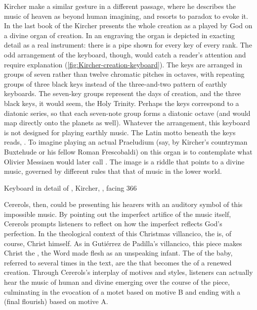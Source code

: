 Kircher make a similar gesture in a different passage, where he describes the
music of heaven as beyond human imagining, and resorts to paradox to evoke it.
In the last book of the  Kircher presents the whole creation as
a  played by God on a divine organ of creation.%
    \Autocite[177]{Godwin:KircherTheater}
In an engraving the organ is depicted in exacting detail as a real instrument:
there is a pipe shown for every key of every rank.%
    \Autocite[, facing 366]{Kircher:Musurgia}
The odd arrangement of the keyboard, though, would catch a reader's attention
and require explanation (\cref{fig:Kircher-creation-keyboard}).
The keys are arranged in groups of seven rather than twelve chromatic pitches in
octaves, with repeating groups of three black keys instead of the three-and-two
pattern of earthly keyboards. 
The seven-key groups represent the days of creation, and the three black keys,
it would seem, the Holy Trinity. 
Perhaps the keys correspond to a diatonic series, so that each seven-note group
forms a diatonic octave (and would map directly onto the planets as well).
Whatever the arrangement, this keyboard is not designed for playing earthly
music.
The Latin motto beneath the keys reads, .
To imagine playing an actual Praeludium (say, by Kircher's countryman Buxtehude
or his fellow Roman Frescobaldi) on this organ is to contemplate what Olivier
Messiaen would later call .%
    \Autocite{Messiaen:Technique}
The image is a riddle that points to a divine music, governed by different rules
that that of music in the lower world.

{Keyboard in detail of , Kircher, , facing 366}

Cererols, then, could be presenting his hearers with an auditory symbol of this
impossible music.
By pointing out the imperfect artifice of the music itself, Cererols prompts
listeners to reflect on how the imperfect reflects God's perfection.
In the theological context of this Christmas villancico, the  is, of course, Christ himself.
As in Gutiérrez de Padilla's villancico, this piece makes Christ the
, the Word made flesh as an unspeaking infant.
The  of the baby, referred to several times in the text, are the
 that becomes the  of a renewed creation.
Through Cererols's interplay of motives and styles, listeners can actually hear
the music of human and divine emerging over the course of the piece, culminating
in the evocation of a motet based on motive B and ending with a 
(final flourish) based on motive A.

